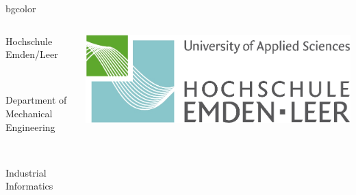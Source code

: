 {%
\begin{beamercolorbox}[rounded=true, center]{bgcolor}
\begin{columns}[T]
\begin{column}{9cm}
{\color{gray}\begin{tiny}Hochschule Emden/Leer\end{tiny}} \\ 
{\color{gray}\begin{tiny}Department of Mechanical Engineering\end{tiny}} \\ 
{\color{gray}\begin{tiny}Industrial Informatics\end{tiny}} \\
\end{column}
\begin{column}{2cm}
\includegraphics[scale=0.25]{img/technik.jpg}
\end{column}
\end{columns}
\end{beamercolorbox}
 }
\insertsectionhead
\insertsubsectionhead
{}
\usebackgroundtemplate
{%
      \rule{0pt}{\paperheight}%
      \hspace*{\paperwidth}%
 }

